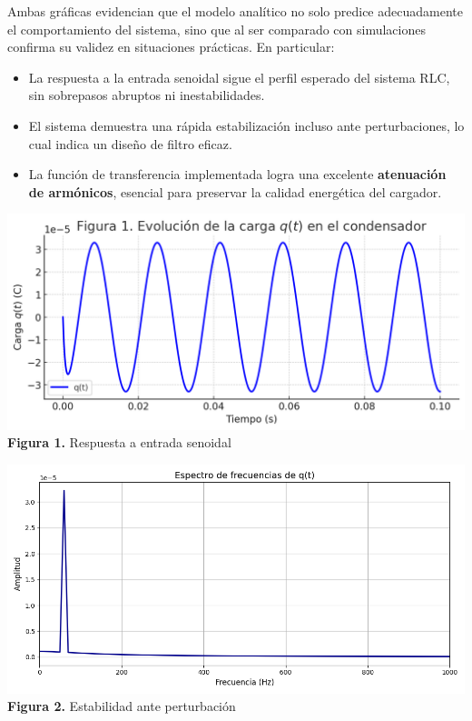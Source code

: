 \documentclass[12pt]{article}
\begin{document}
\begin{tcbposter}
{        \vspace{2mm}

        Ambas gráficas evidencian que el modelo analítico no solo predice adecuadamente el comportamiento del sistema, sino que al ser comparado con simulaciones confirma su validez en situaciones prácticas. En particular:

        \begin{itemize}
            \item La respuesta a la entrada senoidal sigue el perfil esperado del sistema RLC, sin sobrepasos abruptos ni inestabilidades.
            \item El sistema demuestra una rápida estabilización incluso ante perturbaciones, lo cual indica un diseño de filtro eficaz.
            \item La función de transferencia implementada logra una excelente \textbf{atenuación de armónicos}, esencial para preservar la calidad energética del cargador.
        \end{itemize}

        \vspace{2mm}

        \begin{minipage}[t]{0.49\textwidth}
            \centering
            \includegraphics[width=\linewidth]{img/7.png}\\
            \textbf{Figura 1.} Respuesta a entrada senoidal
        \end{minipage}
        \hfill
        \begin{minipage}[t]{0.49\textwidth}
            \centering
            \includegraphics[width=\linewidth]{img/8.png}\\
            \textbf{Figura 2.} Estabilidad ante perturbación
        \end{minipage}

}
\end{tcbposter}
\end{document}
